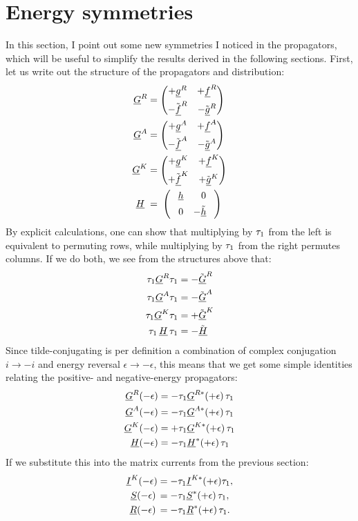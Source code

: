 \clearpage
\section{Energy symmetries}
In this section, I point out some new symmetries I noticed in the propagators, which will be useful to simplify the results derived in the following sections.
First, let us write out the structure of the propagators and distribution:
\begin{align}
  \U{G}^R &= 
  \begin{pmatrix}
    +\U{g}^R  & +\U{f}^R  \\[1ex]
   -\TU{f}^R & -\TU{g}^R
  \end{pmatrix} \\
  \U{G}^A &= 
  \begin{pmatrix}
    +\U{g}^A  & +\U{f}^A  \\[1ex]
   -\TU{f}^A & -\TU{g}^A
  \end{pmatrix} \\
  \U{G}^K &= 
  \begin{pmatrix}
    +\U{g}^K  & +\U{f}^K  \\[1ex]
   +\TU{f}^K & +\TU{g}^K
  \end{pmatrix} \\
  \U{H} \;&= \;
  \begin{pmatrix}
    \PM\U{h}  & \PM0\PM  \\[1ex]
    \PM0      & -\TU{h}\PM
  \end{pmatrix}
\end{align}
By explicit calculations, one can show that multiplying by $\tau_{1}$ from the left is equivalent to permuting rows, while multiplying by $\tau_{1}$ from the right permutes columns.
If we do both, we see from the structures above that:
\begin{align}
  \tau_{1} \underline{G}^R \tau_{1}   &= -\tilde{\underline{G}}^R \\
  \tau_{1} \underline{G}^A \tau_{1}   &= -\tilde{\underline{G}}^A \\
  \tau_{1} \underline{G}^K \tau_{1}   &= +\tilde{\underline{G}}^K \\
  \tau_{1} \,\underline{H}\, \tau_{1} &= -\tilde{\underline{H}}
\end{align}
Since tilde-conjugating is per definition a combination of complex conjugation $i \rightarrow -i$ and energy reversal $\epsilon \rightarrow -\epsilon$, this means that we get some simple identities relating the positive- and negative-energy propagators:
\begin{align}
  \underline{G}^R(-\epsilon) &= -\tau_{1}\underline{G}^{R*}(+\epsilon)\,\tau_{1} \\
  \underline{G}^A(-\epsilon) &= -\tau_{1}\underline{G}^{A*}(+\epsilon)\,\tau_{1} \\
  \underline{G}^K(-\epsilon) &= +\tau_{1}\underline{G}^{K*}(+\epsilon)\,\tau_{1} \\
  \underline{H}(-\epsilon)   &= -\tau_{1}\underline{H}^{*}(+\epsilon) \,\tau_{1}
\end{align}
If we substitute this into the matrix currents from the previous section:
\begin{align}
  \underline{I}^K(-\epsilon) &= -\tau_{1} \underline{I}^{K*}(+\epsilon)\tau_{1}, \\
  \underline{S}(-\epsilon)\, &= -\tau_{1} \underline{S}^*(+\epsilon)\, \tau_{1}, \\
  \underline{R}(-\epsilon)\, &= -\tau_{1} \underline{R}^*(+\epsilon)\, \tau_{1}.
\end{align}


